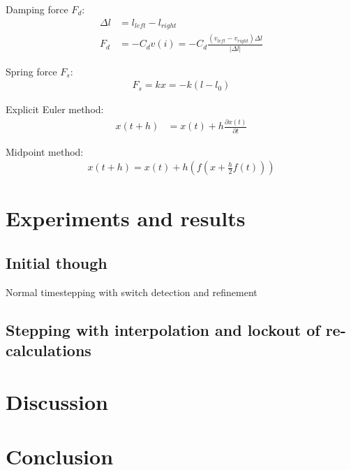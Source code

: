 \documentclass[11pt,a4paper]{article}
\providecommand{\abs}[1]{\left \lvert #1 \right \rvert}
\begin{document}
Damping force $F_d$:
\begin{align*}
    \Delta l &= l_{left} - l_{right} \\
    F_d      &= - C_d v(i) =  - C_d \frac{\left(v_{left} - v_{right}\right)
\Delta l}{\abs{\Delta l}}
\end{align*}

Spring force $F_s$:
\begin{align*}
    F_s = kx = -k \left( l - l_0 \right)
\end{align*}

Explicit Euler method:
\begin{align*}
    x(t+h) &= x(t) + h \frac{\partial x(t)}{\partial t}
\end{align*}

Midpoint method:
\begin{align*}
    x(t+h) = x(t) + h \left( f \left(x + \frac{h}{2} f \left(t \right) \right) \right)
\end{align*}

\section{Experiments and results}

\subsection{Initial though}
Normal timestepping with switch detection and refinement

\subsection{Stepping with interpolation and lockout of re-calculations}

\section{Discussion}

\section{Conclusion}


\cite{Keshav:2007}


\end{document}
